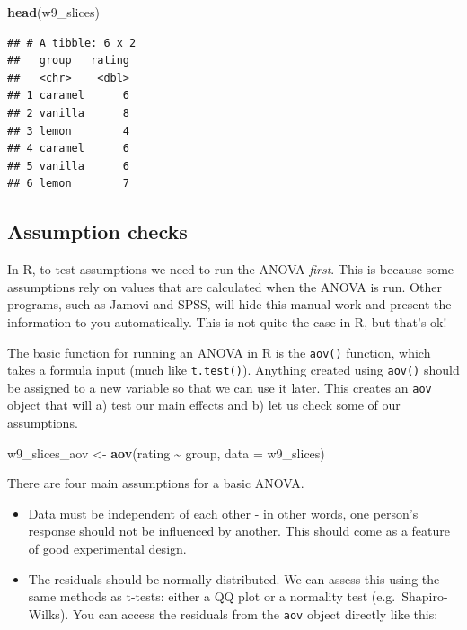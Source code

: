 \documentclass[
]{book}
\newenvironment{Shaded}{\begin{snugshade}}{\end{snugshade}}
\newcommand{\AttributeTok}[1]{\textcolor[rgb]{0.13,0.29,0.53}{#1}}
\newcommand{\FunctionTok}[1]{\textcolor[rgb]{0.13,0.29,0.53}{\textbf{#1}}}
\newcommand{\NormalTok}[1]{#1}
\newcommand{\OtherTok}[1]{\textcolor[rgb]{0.56,0.35,0.01}{#1}}
\newcommand{\SpecialCharTok}[1]{\textcolor[rgb]{0.81,0.36,0.00}{\textbf{#1}}}
\providecommand{\tightlist}{%
  \setlength{\itemsep}{0pt}\setlength{\parskip}{0pt}}
\begin{document}
\begin{Shaded}
\begin{Highlighting}[]
\FunctionTok{head}\NormalTok{(w9\_slices)}
\end{Highlighting}
\end{Shaded}

\begin{verbatim}
## # A tibble: 6 x 2
##   group   rating
##   <chr>    <dbl>
## 1 caramel      6
## 2 vanilla      8
## 3 lemon        4
## 4 caramel      6
## 5 vanilla      6
## 6 lemon        7
\end{verbatim}

\hypertarget{assumption-checks-3}{%
\subsection{Assumption checks}\label{assumption-checks-3}}

In R, to test assumptions we need to run the ANOVA \emph{first}. This is because some assumptions rely on values that are calculated when the ANOVA is run. Other programs, such as Jamovi and SPSS, will hide this manual work and present the information to you automatically. This is not quite the case in R, but that's ok!

The basic function for running an ANOVA in R is the \texttt{aov()} function, which takes a formula input (much like \texttt{t.test()}). Anything created using \texttt{aov()} should be assigned to a new variable so that we can use it later. This creates an \texttt{aov} object that will a) test our main effects and b) let us check some of our assumptions.

\begin{Shaded}
\begin{Highlighting}[]
\NormalTok{w9\_slices\_aov }\OtherTok{\textless{}{-}} \FunctionTok{aov}\NormalTok{(rating }\SpecialCharTok{\textasciitilde{}}\NormalTok{ group, }\AttributeTok{data =}\NormalTok{ w9\_slices)}
\end{Highlighting}
\end{Shaded}

There are four main assumptions for a basic ANOVA.

\begin{itemize}
\tightlist
\item
  Data must be independent of each other - in other words, one
  person's response should not be influenced by another. This should
  come as a feature of good experimental design.
\item
  The residuals should be normally distributed. We can assess this
  using the same methods as t-tests: either a QQ plot or a normality
  test (e.g.~Shapiro-Wilks). You can access the residuals from the
  \texttt{aov} object directly like this:
\end{itemize}
\end{document}
